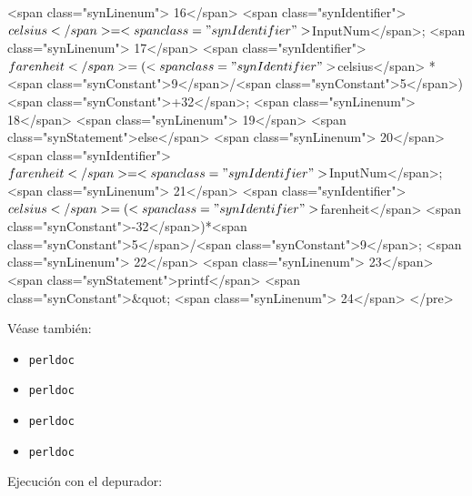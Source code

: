 \begin{rawhtml}
{{<span class="synLinenum">   16</span>       <span class="synIdentifier">$celsius</span> = <span class="synIdentifier">$InputNum</span>;
<span class="synLinenum">   17</span>       <span class="synIdentifier">$farenheit</span> = (<span class="synIdentifier">$celsius</span> * <span class="synConstant">9</span>/<span class="synConstant">5</span>)<span class="synConstant">+32</span>;
<span class="synLinenum">   18</span>     }
<span class="synLinenum">   19</span>     <span class="synStatement">else</span> {
<span class="synLinenum">   20</span>       <span class="synIdentifier">$farenheit</span> = <span class="synIdentifier">$InputNum</span>;
<span class="synLinenum">   21</span>       <span class="synIdentifier">$celsius</span> = (<span class="synIdentifier">$farenheit</span> <span class="synConstant">-32</span>)*<span class="synConstant">5</span>/<span class="synConstant">9</span>;
<span class="synLinenum">   22</span>     }
<span class="synLinenum">   23</span>     <span class="synStatement">printf</span> <span class="synConstant">&quot;%
<span class="synLinenum">   24</span>   }
</pre>

\end{rawhtml}


Véase también:

\begin{itemize}
\item \verb|perldoc| 
\item \verb|perldoc| 
\item \verb|perldoc| 
\item \verb|perldoc| 
\end{itemize}

Ejecución con el depurador:

